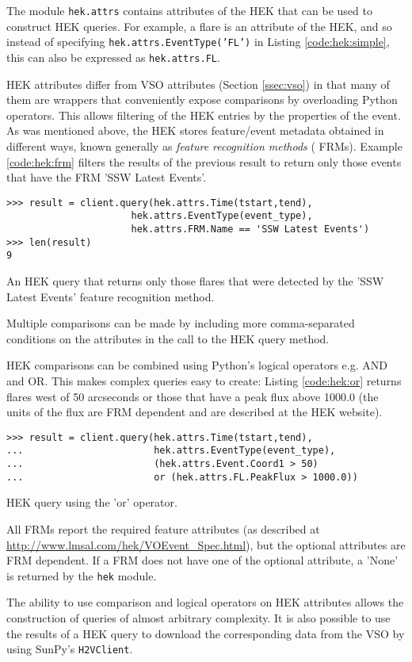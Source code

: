 The module \texttt{hek.attrs} contains attributes of the HEK that can be used to
construct HEK queries.  For example, a flare is an attribute of the HEK, and so 
instead of specifying \texttt{hek.attrs.EventType('FL')} in Listing 
\ref{code:hek:simple}, this can also be expressed as \texttt{hek.attrs.FL}. 

HEK attributes differ from VSO attributes (Section \ref{ssec:vso}) in that many 
of them are wrappers that conveniently expose comparisons by overloading Python 
operators.  This allows filtering of the HEK entries by the properties of the 
event.  As was mentioned above, the HEK stores feature/event metadata obtained 
in different ways, known generally as {\it feature recognition methods} ( 
FRMs). Example \ref{code:hek:frm} filters the results of the previous result to 
return only those events that have the FRM 'SSW Latest Events'.
\begin{listing}[H]
\begin{verbatim}
>>> result = client.query(hek.attrs.Time(tstart,tend), 
                      hek.attrs.EventType(event_type),
                      hek.attrs.FRM.Name == 'SSW Latest Events')
>>> len(result)
9
\end{verbatim}
\caption{An HEK query that returns only those flares that were
  detected by the 'SSW Latest Events' feature recognition method.}
\label{code:hek:frm}
\end{listing}
Multiple comparisons can be made by including more comma-separated
conditions on the attributes in the call to the HEK query method.

HEK comparisons can be combined using Python’s logical operators e.g. AND
and OR. This makes complex queries easy to create: Listing \ref{code:hek:or} 
returns flares west of 50 arcseconds or those that have a peak flux above 
1000.0 (the units of the flux are FRM dependent and are described at the HEK 
website).
\begin{listing}[H]
\begin{verbatim}
>>> result = client.query(hek.attrs.Time(tstart,tend), 
...                       hek.attrs.EventType(event_type),
...                       (hek.attrs.Event.Coord1 > 50) 
...                       or (hek.attrs.FL.PeakFlux > 1000.0))
\end{verbatim}
\caption{HEK query using the 'or' operator.}
\label{code:hek:or}
\end{listing}
All FRMs report the required feature attributes (as described at 
\url{http://www.lmsal.com/hek/VOEvent_Spec.html}), but the optional attributes 
are FRM dependent.  If a FRM does not have one of the optional attribute, a 
'None' is returned by the \texttt{hek} module. 

The ability to use comparison and logical operators on HEK attributes allows 
the construction of queries of almost arbitrary complexity. 
It is also possible to use the 
results of a HEK query to download the corresponding data from the VSO by using 
SunPy's \texttt{H2VClient}.
